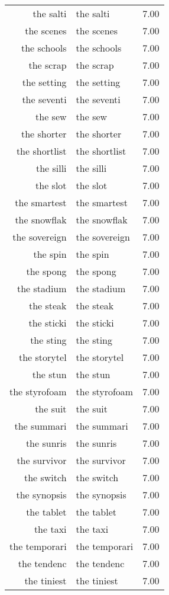 \begin{table}[ht]
\begin{tabular}{rlr}
  the salti & the salti & 7.00 \\ 
  the scenes & the scenes & 7.00 \\ 
  the schools & the schools & 7.00 \\ 
  the scrap & the scrap & 7.00 \\ 
  the setting & the setting & 7.00 \\ 
  the seventi & the seventi & 7.00 \\ 
  the sew & the sew & 7.00 \\ 
  the shorter & the shorter & 7.00 \\ 
  the shortlist & the shortlist & 7.00 \\ 
  the silli & the silli & 7.00 \\ 
  the slot & the slot & 7.00 \\ 
  the smartest & the smartest & 7.00 \\ 
  the snowflak & the snowflak & 7.00 \\ 
  the sovereign & the sovereign & 7.00 \\ 
  the spin & the spin & 7.00 \\ 
  the spong & the spong & 7.00 \\ 
  the stadium & the stadium & 7.00 \\ 
  the steak & the steak & 7.00 \\ 
  the sticki & the sticki & 7.00 \\ 
  the sting & the sting & 7.00 \\ 
  the storytel & the storytel & 7.00 \\ 
  the stun & the stun & 7.00 \\ 
  the styrofoam & the styrofoam & 7.00 \\ 
  the suit & the suit & 7.00 \\ 
  the summari & the summari & 7.00 \\ 
  the sunris & the sunris & 7.00 \\ 
  the survivor & the survivor & 7.00 \\ 
  the switch & the switch & 7.00 \\ 
  the synopsis & the synopsis & 7.00 \\ 
  the tablet & the tablet & 7.00 \\ 
  the taxi & the taxi & 7.00 \\ 
  the temporari & the temporari & 7.00 \\ 
  the tendenc & the tendenc & 7.00 \\ 
  the tiniest & the tiniest & 7.00 \\ 

\end{tabular}
\end{table}
